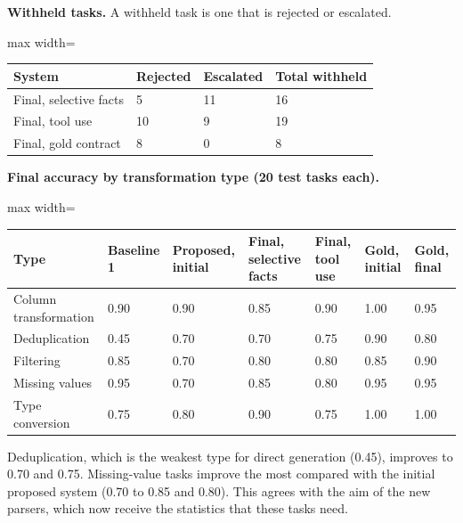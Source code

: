 \documentclass[11pt]{article}
\begin{document}
\textbf{Withheld tasks.} A withheld task is one that is rejected or
escalated.

\begin{table}[!tp]
\centering\footnotesize\setlength{\tabcolsep}{3pt}\renewcommand{\arraystretch}{1.1}
\begin{adjustbox}{max width=\textwidth}\begin{tabular}{llll}
\toprule
\textbf{System} & \textbf{Rejected} & \textbf{Escalated} & \textbf{Total withheld} \\
\midrule
Final, selective facts & 5 & 11 & 16 \\
Final, tool use & 10 & 9 & 19 \\
Final, gold contract & 8 & 0 & 8 \\
\bottomrule
\end{tabular}\end{adjustbox}
\end{table}

\textbf{Final accuracy by transformation type (20 test tasks each).}

\begin{table}[!tp]
\centering\scriptsize\setlength{\tabcolsep}{3pt}\renewcommand{\arraystretch}{1.1}
\begin{adjustbox}{max width=\textwidth}\begin{tabular}{lllllll}
\toprule
\textbf{Type} & \textbf{Baseline 1} & \textbf{Proposed, initial} & \textbf{Final, selective facts} & \textbf{Final, tool use} & \textbf{Gold, initial} & \textbf{Gold, final} \\
\midrule
Column transformation & 0.90 & 0.90 & 0.85 & 0.90 & 1.00 & 0.95 \\
Deduplication & 0.45 & 0.70 & 0.70 & 0.75 & 0.90 & 0.80 \\
Filtering & 0.85 & 0.70 & 0.80 & 0.80 & 0.85 & 0.90 \\
Missing values & 0.95 & 0.70 & 0.85 & 0.80 & 0.95 & 0.95 \\
Type conversion & 0.75 & 0.80 & 0.90 & 0.75 & 1.00 & 1.00 \\
\bottomrule
\end{tabular}\end{adjustbox}
\end{table}

Deduplication, which is the weakest type for direct generation (0.45),
improves to 0.70 and 0.75. Missing-value tasks improve the most compared
with the initial proposed system (0.70 to 0.85 and 0.80). This agrees
with the aim of the new parsers, which now receive the statistics that
these tasks need.
\end{document}
